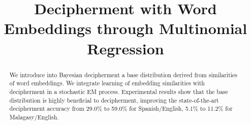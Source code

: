 \documentclass[11pt]{article}
\title{Decipherment with Word Embeddings through Multinomial Regression}
\date{}
\begin{document}
\maketitle
\begin{abstract}
We introduce into Bayesian decipherment a base distribution derived from similarities of word embeddings. We integrate learning of embedding similarities with decipherment in a stochastic EM process. Experimental results show that the base distribution is highly beneficial to decipherment, improving the state-of-the-art decipherment accuracy from 29.0\% to 59.0\% for Spanish/English, 5.1\% to 11.2\% for Malagasy/English. 
\end{abstract}




%
%








\end{document}

